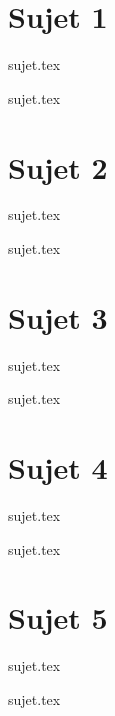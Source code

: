 \documentclass[a4paper, 11pt]{book}
\begin{document}
\chapter{Sujet 1}

\resetQ
{sujet.tex}

\resetQ
{sujet.tex}

\chapter{Sujet 2}

\resetQ
{sujet.tex}

\resetQ
{sujet.tex}

\chapter{Sujet 3}

\resetQ
{sujet.tex}

\resetQ
{sujet.tex}

\chapter{Sujet 4}

\resetQ
{sujet.tex}

\resetQ
{sujet.tex}

\chapter{Sujet 5}

\resetQ
{sujet.tex}

\resetQ
{sujet.tex}

\label{LastPage}
\end{document}
